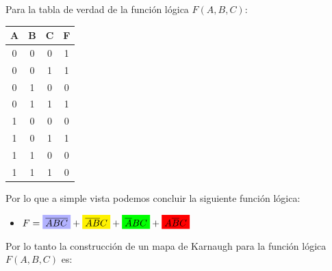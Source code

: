 \documentclass{templateNote}
\begin{document}
\begin{tcolorbox}[colback=blue!10!white,colframe=blue!75!black,title=Ejemplo]
    Para la tabla de verdad de la función lógica $F(A,B,C)$:
    \begin{table}[H]
        \centering
        \begin{tabular}{|c|c|c|c|}
        \hline
        A & B & C & F\\
        \hline
        \rowcolor{purple!30} 0 & 0 & 0 & \cellcolor{purple}1\\
        \rowcolor{purple!30} 0 & 0 & 1 & \cellcolor{purple}1\\
        0 & 1 & 0 & 0\\
        \rowcolor{purple!30} 0 & 1 & 1 & \cellcolor{purple}1\\
        1 & 0 & 0 & 0\\
        \rowcolor{purple!30} 1 & 0 & 1 & \cellcolor{purple}1\\
        1 & 1 & 0 & 0\\
        1 & 1 & 1 & 0\\
        \hline
        \end{tabular}
    \end{table}
Por lo que a simple vista podemos concluir la siguiente función lógica:
\begin{itemize}
    \item $F = \colorbox{blue!30}{$\overline{ABC}$} + \colorbox{yellow}{$\overline{AB}C$} +  \colorbox{green}{$\overline{A}BC$} + \colorbox{red}{$A\overline{B}C$}$
\end{itemize}
Por lo tanto la construcción de un mapa de Karnaugh para la función lógica $F(A,B,C)$ es:
\begin{center}
\end{center}
\end{tcolorbox}
\end{document}
